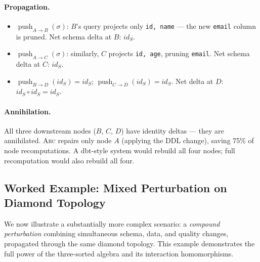 \documentclass[sigplan,screen,nonacm]{acmart}
\newcommand{\arc}{\textsc{Arc}\xspace}
\newcommand{\compose}{\mathbin{\circ}}
\newcommand{\push}{\operatorname{push}}
\begin{document}
\paragraph{Propagation.}
\begin{itemize}
\item $\push_{A\to B}(\sigma)$: $B$'s query projects only \texttt{id,
  name} --- the new \texttt{email} column is pruned.  Net schema delta at
  $B$: $\mathit{id}_S$.
\item $\push_{A\to C}(\sigma)$: similarly, $C$ projects \texttt{id, age},
  pruning \texttt{email}.  Net schema delta at $C$: $\mathit{id}_S$.
\item $\push_{B\to D}(\mathit{id}_S) = \mathit{id}_S$;
  $\push_{C\to D}(\mathit{id}_S) = \mathit{id}_S$.
  Net delta at $D$: $\mathit{id}_S \compose \mathit{id}_S = \mathit{id}_S$.
\end{itemize}

\paragraph{Annihilation.}
All three downstream nodes ($B$, $C$, $D$) have identity deltas ---
they are annihilated.  \arc repairs only node $A$ (applying the DDL
change), saving 75\% of node recomputations.  A dbt-style system
would rebuild all four nodes; full recomputation would also rebuild
all four.

\subsection{Worked Example: Mixed Perturbation on Diamond Topology}\label{sec:example-mixed}

We now illustrate a substantially more complex scenario: a
\emph{compound perturbation} combining simultaneous schema, data, and
quality changes, propagated through the same diamond topology.  This
example demonstrates the full power of the three-sorted algebra and
its interaction homomorphisms.

\begin{center}
\end{center}
\end{document}
